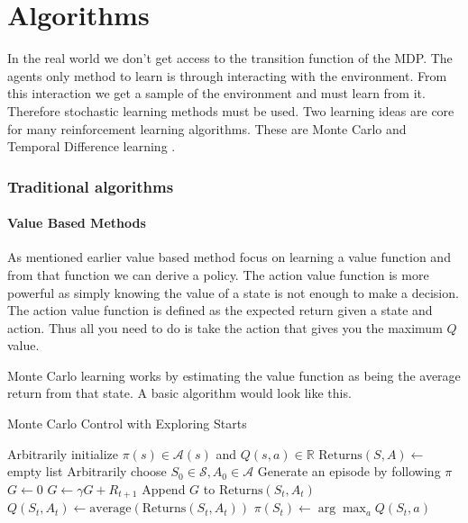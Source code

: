 \chapter{Algorithms}\label{C:algorithms}

In the real world we don't get access to the transition function of the MDP. The agents only method to learn is through interacting with the environment. From this interaction we get a sample of the environment and must learn from it. Therefore stochastic learning methods must be used. Two learning ideas are core for many reinforcement learning algorithms. These are Monte Carlo \cite{suttonReinforcementLearningSecond2018} and Temporal Difference learning \cite{suttonTemporalCreditAssignment1984} \cite{suttonLearningPredictMethods1988}.

\subsection{Traditional algorithms}

\subsubsection{Value Based Methods}

As mentioned earlier value based method focus on learning a value function and from that function we can derive a policy. The action value function is more powerful as simply knowing the value of a state is not enough to make a decision. The action value function is defined as the expected return given a state and action. Thus all you need to do is take the action that gives you the maximum $Q$ value.


Monte Carlo learning works by estimating the value function as being the average return from that state.  A basic algorithm would look like this.

\begin{algorithm}
\caption{Monte Carlo Control with Exploring Starts}
\begin{algorithmic}[1]
\State Arbitrarily initialize $\pi(s) \in \mathcal{A}(s)$ and $Q(s,a) \in \mathbb{R}$
\State $\text{Returns}(S,A) \gets$ empty list
    \State Arbitrarily choose $S_0 \in \mathcal{S}, A_0 \in \mathcal{A}$
    \State Generate an episode by following $\pi$
    \State $G \gets 0$
        \State $G \gets \gamma G + R_{t+1}$
            \State Append $G$ to $\text{Returns}(S_t, A_t)$
            \State $Q(S_t, A_t) \gets \text{average}(\text{Returns}(S_t, A_t))$
            \State $\pi(S_t) \gets \arg\max_{a} Q(S_t, a)$
        \EndIf
    \EndFor
\EndFor
\end{algorithmic}
\end{algorithm}

